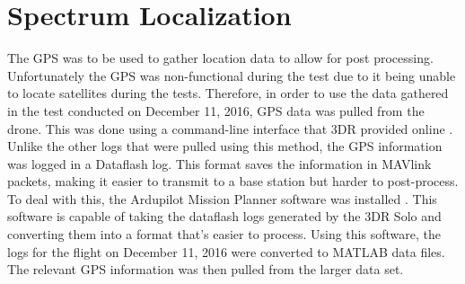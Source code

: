 \section{Spectrum Localization}
The GPS was to be used to gather location data to allow for post processing. Unfortunately the GPS was non-functional during the test due to it being unable to locate satellites during the tests. Therefore, in order to use the data gathered in the test conducted on December 11, 2016, GPS 
data was pulled from the drone. This was done using a command-line interface that 
3DR provided online \cite{3dr_devguide}. Unlike the other logs that were pulled using this method,
the GPS information was logged in a Dataflash log. This format saves the information
in MAVlink packets, making it easier to transmit to a base station but harder
to post-process. To deal with this, the Ardupilot Mission Planner software was 
installed \cite{ard_mplanner}. This software is capable of taking the dataflash logs
generated by the 3DR Solo and converting them into a format that's easier to
process. Using this software, the logs for the flight on December 11, 2016 were 
converted to MATLAB data files. The relevant GPS information was then pulled from
the larger data set. \par

